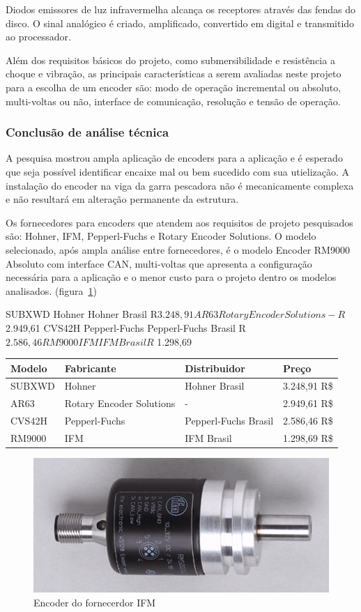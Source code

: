 Diodos emissores de luz infravermelha alcança os receptores através das fendas do disco. O sinal analógico é criado, amplificado, convertido em digital e transmitido ao processador.

Além dos requisitos básicos do projeto, como submersibilidade e resistência a choque e vibração, as principais características a serem avaliadas neste projeto para a escolha de um encoder são: modo de operação incremental ou absoluto, multi-voltas ou não, interface de comunicação, resolução e tensão de operação.

 \subsubsection{Conclusão de análise técnica}
A pesquisa mostrou ampla aplicação de encoders para a aplicação e é esperado que seja possível identificar encaixe mal ou bem sucedido com sua utielização. A instalação do encoder na viga da garra pescadora não é mecanicamente complexa e não resultará em alteração permanente da estrutura.


Os fornecedores para encoders que atendem aos requisitos de projeto pesquisados são: Hohner, IFM, Pepperl-Fuchs e Rotary Encoder Solutions. O modelo selecionado, após ampla análise entre fornecedores, é o
modelo Encoder RM9000 Absoluto com interface CAN, multi-voltas que apresenta a configuração necessária para a aplicação e o menor custo para o projeto dentro os modelos analisados. 
(figura~\ref{encoder_1})

SUBXWD	Hohner	Hohner Brasil	R$ 3.248,91
AR63	Rotary Encoder Solutions	-	R$ 2.949,61
CVS42H	Pepperl-Fuchs	Pepperl-Fuchs Brasil	R$ 2.586,46
RM9000	IFM	IFM Brasil	R$ 1.298,69

\begin{center}
    \begin{tabular}{| l | l | l | l | }
    \hline
	{\bf Modelo} 	& 	{\bf Fabricante} 	&		{\bf Distribuidor}	&	{\bf Preço} \\  \hline
	SUBXWD&			Hohner&					Hohner Brasil&			 3.248,91 R{\$} \\  \hline
	AR63&			Rotary Encoder Solutions	&	-&					2.949,61 R{\$} \\  \hline
	CVS42H&			Pepperl-Fuchs&			Pepperl-Fuchs Brasil&	2.586,46 R{\$} \\  \hline
	RM9000&			IFM&						IFM Brasil&			1.298,69 R{\$} \\ \hline
\hline 
\end{tabular}
\end{center}

\begin{figure}[H]
    \centering
    \includegraphics[width=0.4\columnwidth]{figs/encoder/1.png}
    \caption{Encoder do fornecerdor IFM}
    \label{encoder_1}
\end{figure}


